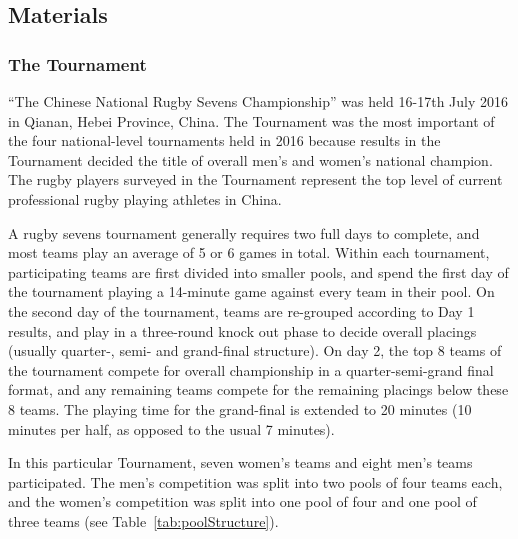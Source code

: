 \subsection{Materials}
\subsubsection{The Tournament}
``The Chinese National Rugby Sevens Championship'' was held 16-17th July 2016 in Qianan, Hebei Province, China. The Tournament was the most important of the four national-level tournaments held in 2016 because results in the Tournament decided the title of overall men's and women’s national champion. The rugby players surveyed in the Tournament represent the top level of current professional rugby playing athletes in China.

A rugby sevens tournament generally requires two full days to complete, and most teams play an average of 5 or 6 games in total. Within each tournament, participating teams are first divided into smaller pools, and spend the first day of the tournament playing a 14-minute game against every team in their pool. On the second day of the tournament, teams are re-grouped according to Day 1 results, and play in a three-round knock out phase to decide overall placings (usually quarter-, semi- and grand-final structure). On day 2, the top 8 teams of the tournament compete for overall championship in a quarter-semi-grand final format, and any remaining teams compete for the remaining placings below these 8 teams. The playing time for the grand-final is extended to 20 minutes (10 minutes per half, as opposed to the usual 7 minutes).

In this particular Tournament, seven women's teams and eight men's teams participated.  The men’s competition was split into two pools of four teams each, and the women’s competition was split into one pool of four and one pool of three teams (see Table~\ref{tab:poolStructure}). \\


